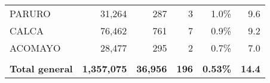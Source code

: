 \begin{tabular}{lrrrrr}
	\cellcolor[HTML]{FFFFC7}PARURO        & 31,264                                                         & 287                                                                              & 3                                                                & 1.0\%                                                                  & 9.6                                                                                                                               \\
	\cellcolor[HTML]{FFFFC7}CALCA         & 76,462                                                         & 761                                                                              & 7                                                                & 0.9\%                                                                  & 9.2                                                                                                                               \\
	\cellcolor[HTML]{FFFFC7}ACOMAYO       & 28,477                                                         & 295                                                                              & 2                                                                & 0.7\%                                                                  & 7.0                                                                                                                               \\
	&                                                                &                                                                                  &                                                                  &                                                                        &                                                                                                                                   \\
	\rowcolor[HTML]{ECF4FF} 
	\textbf{Total general}                & \textbf{1,357,075}                                             & \textbf{36,956}                                                                  & \textbf{196}                                                     & \textbf{0.53\%}                                                        & \textbf{14.4}                                                                                                                    
\end{tabular}
